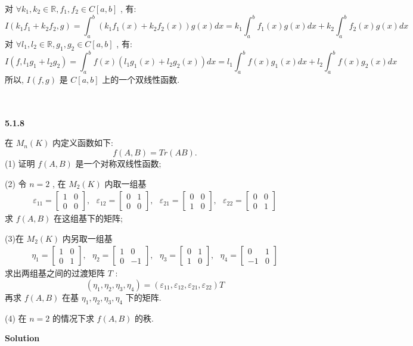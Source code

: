 \documentclass[11pt,a4paper,openany,oneside]{book}
\newcommand\Solution{\noindent\textbf{\textsf{Solution}}\par\medskip}
\begin{document}
对 $ \forall k_1, k_2 \in \mathbb{R}, f_1, f_2 \in C[a, b] $ , 有:
 $$  I(k_1f_1+k_2f_2, g) = \int_a^b (k_1f_1(x) + k_2f_2(x))g(x)dx = k_1\int_a^bf_1(x)g(x)dx + k_2\int_a^b f_2(x)g(x) dx  $$ 
对 $ \forall l_1, l_2 \in \mathbb{R}, g_1, g_2 \in C[a, b] $ , 有:
 $$  I(f, l_1g_1 + l_2g_2) = \int_a^b f(x)(l_1g_1(x) + l_2g_2(x))dx = l_1\int_a^b f(x)g_1(x)dx + l_2\int_a^b f(x)g_2(x) dx  $$ 
所以,  $ I(f, g) $ 是 $ C[a, b] $ 上的一个双线性函数. \\  \\  \\


\begin{myexample}
	\textbf{5.1.8}

在 $ M_n(K) $ 内定义函数如下:
 $$  f(A,B) = Tr(AB).  $$ 
(1) 证明 $ f(A,B) $ 是一个对称双线性函数; 

(2) 令 $ n=2 $ , 在 $ M_2(K) $ 内取一组基
\begin{gather*}
\varepsilon_{11} = 
\begin{bmatrix}
1  &  0  \\
0  &  0
\end{bmatrix}, \ \ \ 
\varepsilon_{12} =
\begin{bmatrix}
0  &  1  \\
0  &  0
\end{bmatrix}, \ \ \ 
\varepsilon_{21} =
\begin{bmatrix}
0  &  0  \\
1  &  0
\end{bmatrix}, \ \ \ 
\varepsilon_{22} = 
\begin{bmatrix}
0  &  0  \\
0  &  1
\end{bmatrix}
\end{gather*}
求 $ f(A,B) $ 在这组基下的矩阵; 

(3)在 $ M_2(K) $ 内另取一组基
\begin{gather*}
\eta_1 = 
\begin{bmatrix}
1  &  0  \\
0  &  1
\end{bmatrix}, \ \ \ 
\eta_2 =
\begin{bmatrix}
1  &  0  \\
0  &  -1
\end{bmatrix}, \ \ \ 
\eta_3 =
\begin{bmatrix}
0  &  1  \\
1  &  0
\end{bmatrix}, \ \ \ 
\eta_4 = 
\begin{bmatrix}
0  &  1  \\
-1  &  0
\end{bmatrix}
\end{gather*}
求出两组基之间的过渡矩阵 $ T $ :
 $$  (\eta_1, \eta_2, \eta_3, \eta_4) = (\varepsilon_{11}, \varepsilon_{12}, \varepsilon_{21}, \varepsilon_{22})T  $$ 
再求 $ f(A, B) $ 在基 $ \eta_1, \eta_2, \eta_3, \eta_4 $ 下的矩阵. 

(4) 在 $ n=2 $ 的情况下求 $ f(A,B) $ 的秩. 

\end{myexample}
\Solution 
\end{document}
